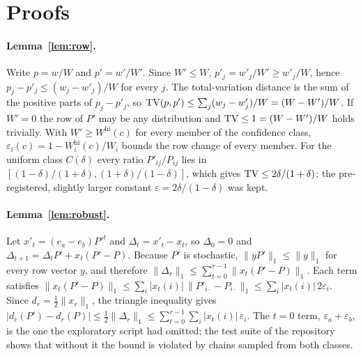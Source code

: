 \appendix

\section{Proofs}\label{app:proofs}

\paragraph{Lemma~\ref{lem:row}.}
Write $p=w/W$ and $p'=w'/W'$. Since $W'\le W$, $p'_j=w'_j/W'\ge w'_j/W$, hence
$p_j-p'_j\le (w_j-w'_j)/W$ for every $j$. The total-variation distance is the sum of the positive
parts of $p_j-p'_j$, so $\operatorname{TV}(p,p')\le\sum_j (w_j-w'_j)/W=(W-W')/W$. If $W'=0$ the row of $P'$ may be
any distribution and $\operatorname{TV}\le1=(W-W')/W$ holds trivially. With $W'\ge W^{\mathrm{hi}}(c)$ for every
member of the confidence class, $\varepsilon_i(c)=1-W^{\mathrm{hi}}_i(c)/W_i$ bounds the row change
of every member. For the uniform class $C(\delta)$ every ratio $P'_{ij}/P_{ij}$ lies in
$[(1-\delta)/(1+\delta),(1+\delta)/(1-\delta)]$, which gives $\operatorname{TV}\le 2\delta/(1+\delta)$; the
pre-registered, slightly larger constant $\varepsilon=2\delta/(1-\delta)$ was kept.

\paragraph{Lemma~\ref{lem:robust}.}
Let $x'_t=(e_a-e_b)P'^t$ and $\Delta_t=x'_t-x_t$, so $\Delta_0=0$ and
$\Delta_{t+1}=\Delta_tP'+x_t(P'-P)$. Because $P'$ is stochastic, $\lVert yP'\rVert_1\le\lVert
y\rVert_1$ for every row vector $y$, and therefore
$\lVert\Delta_r\rVert_1\le\sum_{t=0}^{r-1}\lVert x_t(P'-P)\rVert_1$. Each term satisfies
$\lVert x_t(P'-P)\rVert_1\le\sum_i|x_t(i)|\,\lVert P'_{i\cdot}-P_{i\cdot}\rVert_1\le\sum_i|x_t(i)|\,2\varepsilon_i$.
Since $d_r=\tfrac12\lVert x_r\rVert_1$, the triangle inequality gives
$|d_r(P')-d_r(P)|\le\tfrac12\lVert\Delta_r\rVert_1\le\sum_{t=0}^{r-1}\sum_i|x_t(i)|\,\varepsilon_i$.
The $t=0$ term, $\varepsilon_a+\varepsilon_b$, is the one the exploratory script had omitted; the
test suite of the repository shows that without it the bound is violated by chains sampled from both
classes.

